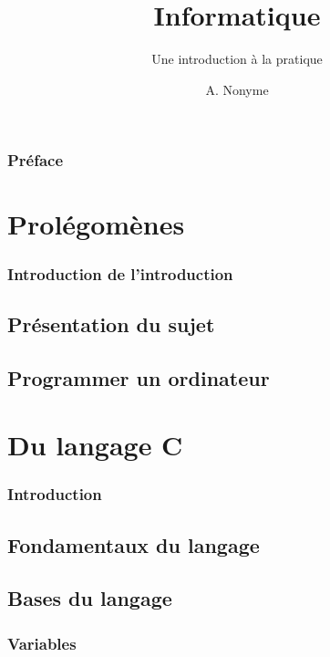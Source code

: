 \documentclass{minitelreport}
\begin{document}
\title{Informatique}
\subtitle{Une introduction à la pratique}
\author{A. Nonyme}
\maketitle
\begin{refsection}
\section*{Préface}

\tableofcontents
\listoftables
\listofdefinition
\newpage
\part{Prolégomènes}
	\section*{Introduction de l'introduction}
	
	\chapter{Présentation du sujet}
		
	\chapter{Programmer un ordinateur}
		
\part{Du langage C}
	\section*{Introduction}
	
	\chapter{Fondamentaux du langage}
		
	\chapter{Bases du langage}
		\section{Variables}
		

\end{refsection}
\end{document}
